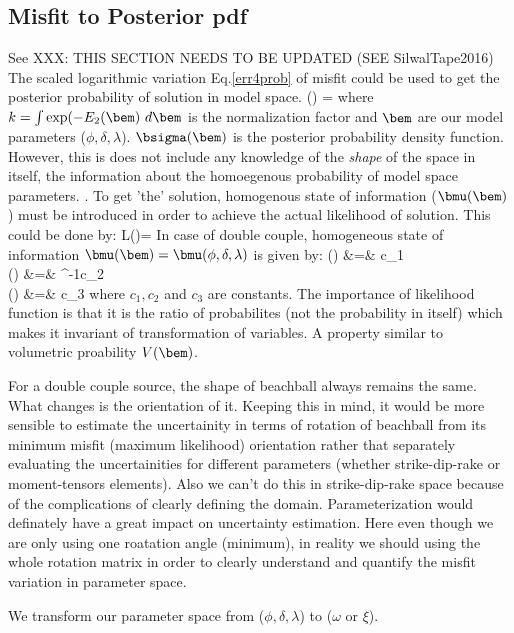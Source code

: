\documentclass[11pt,titlepage,fleqn]{article}
\begin{document}
\subsection{Misfit to Posterior pdf}
See \cite{SilwalTape2016,TapeTape2016}
\iffalse
XXX: THIS SECTION NEEDS TO BE UPDATED (SEE SilwalTape2016) \\ 
The scaled logarithmic variation Eq.\ref{err4prob} of misfit could be used to get the posterior probability of solution in model space. 
\eq
\sigma(\bem) = 
\en
where $k = \int \exp (-E_2(\bem)\ d\bem$ is the normalization factor and $\bem$ are our model parameters ($\phi,\delta,\lambda$). $\bsigma(\bem)$ is the posterior probability density function. However, this is does not include any knowledge of the {\it shape} of the space in itself, \ie the information about the homoegenous probability of model space parameters. \citep{Tarantola2006}. To get 'the' solution, homogenous state of information ($\bmu(\bem)$) must be introduced in order to achieve the actual likelihood of solution. This could be done by:
\eq
L(\bem)=\frac{\bsigma(\bem)}{\bmu(\bem)}
\en
In case of double couple, homogeneous state of information $\bmu(\bem) = \bmu(\phi,\delta,\lambda)$ is given by:
\eqa
\mu(\phi) &=& c_1\\
\mu(\delta) &=& \cos^{-1}c_2\\
\mu(\lambda) &=& c_3
\ena
where $c_1, c_2$ and $c_3$ are constants.
The importance of likelihood function is that it is the ratio of probabilites (not the probability in itself) which makes it invariant of transformation of variables. A property similar to volumetric proability $V(\bem)$.

For a double couple source, the shape of beachball always remains the same. What changes is the orientation of it. Keeping this in mind, it would be more sensible to estimate the uncertainity in terms of rotation of beachball from its minimum misfit (maximum likelihood) orientation rather that separately evaluating the uncertainities for different parameters (whether strike-dip-rake or moment-tensors elements). Also we can't do this in strike-dip-rake space because of the complications of clearly defining the domain. Parameterization would definately have a great impact on uncertainty estimation. Here even though we are only using one roatation angle (minimum), in reality we should using the whole rotation matrix in order to clearly understand and quantify the misfit variation in parameter space.

We transform our parameter space from ($\phi,\delta,\lambda$) to ($\omega$ or $\xi$). 
\end{document}
